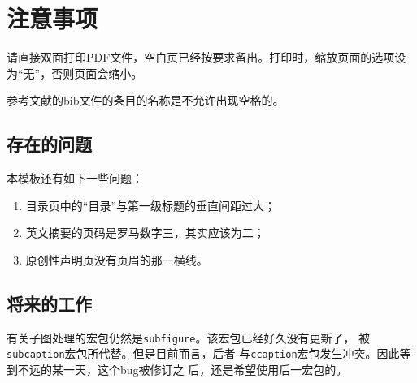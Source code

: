 ﻿%

\chapter{注意事项}
\label{chap03}

请直接双面打印PDF文件，空白页已经按要求留出。打印时，缩放页面的选项设
为“无”，否则页面会缩小。

参考文献的bib文件的条目的名称是不允许出现空格的。

\section{存在的问题}

本模板还有如下一些问题：

\begin{enumerate}
\item 目录页中的“目录”与第一级标题的垂直间距过大；
\item 英文摘要的页码是罗马数字三，其实应该为二；
\item 原创性声明页没有页眉的那一横线。
\end{enumerate}

\section{将来的工作}

有关子图处理的宏包仍然是\texttt{subfigure}。该宏包已经好久没有更新了，
被\texttt{subcaption}宏包所代替。但是目前而言，后者
与\texttt{ccaption}宏包发生冲突。因此等到不远的某一天，这个bug被修订之
后，还是希望使用后一宏包的。






